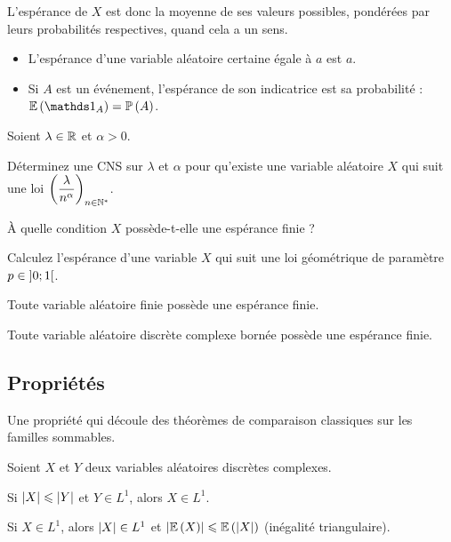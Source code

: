 L'espérance de \(X\) est donc la moyenne de ses valeurs possibles, pondérées par leurs probabilités respectives, quand cela a un sens.

\begin{ex}
\begin{itemize}
    \item L'espérance d'une variable aléatoire certaine égale à \(a\) est \(a\). \\
    \item Si \(A\) est un événement, l'espérance de son indicatrice est sa probabilité : \(\esp{\ind{A}}=\proba{A}\).
\end{itemize}
\end{ex}

\begin{exo}
Soient \(\lambda\in\mathbb{R}\) et \(\alpha>0\).

Déterminez une CNS sur \(\lambda\) et \(\alpha\) pour qu'existe une variable aléatoire \(X\) qui suit une loi \(\left(\dfrac{\lambda}{n^\alpha}\right)_{n\in\mathbb{N}^*}\).

À quelle condition \(X\) possède-t-elle une espérance finie ?
\end{exo}

\begin{exo}
Calculez l'espérance d'une variable \(X\) qui suit une loi géométrique de paramètre \(p\in\left]0;1\right[\).
\end{exo}

\begin{prop}
Toute variable aléatoire finie possède une espérance finie.

Toute variable aléatoire discrète complexe bornée possède une espérance finie.
\end{prop}

\subsection{Propriétés}

Une propriété qui découle des théorèmes de comparaison classiques sur les familles sommables.

\begin{prop}
Soient \(X\) et \(Y\) deux variables aléatoires discrètes complexes.

Si \(\left\lvert X\right\rvert\leqslant\left\lvert Y\right\rvert\) et \(Y\in L^1\), alors \(X\in L^1\).

Si \(X\in L^1\), alors \(\left\lvert X\right\rvert\in L^1\) et \(\left\lvert\operatorname{\mathbb{E}}\left(X\right)\right\rvert\leqslant\operatorname{\mathbb{E}}\left(\left\lvert X\right\rvert\right)\) (inégalité triangulaire).
\end{prop}


